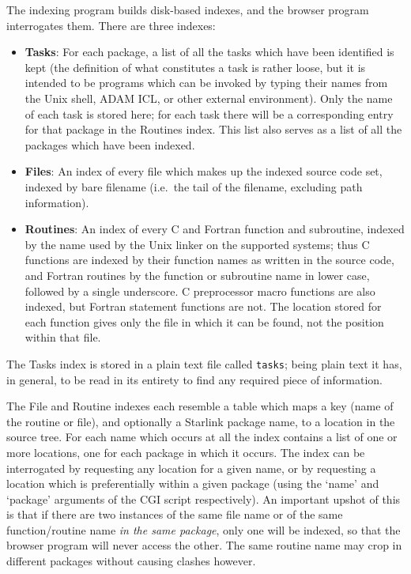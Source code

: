 \documentclass[twoside,11pt]{article}
\renewcommand{\_}{\texttt{\symbol{95}}}
\begin{document}
The indexing program builds disk-based indexes, and the browser program
interrogates them.  There are three indexes:
\begin{itemize}
\item {\bf Tasks}:
For each package, a list of all the tasks which have been identified
is kept (the definition of what constitutes a task is rather 
loose, but it is intended to be programs which can be invoked by
typing their names from the Unix shell, ADAM ICL, or other external
environment).
Only the name of each task is stored here; 
for each task there will be a corresponding entry for
that package in the Routines index.
This list also serves as a list of all the
packages which have been indexed.
%
\item {\bf Files}:
An index of every file which makes up the indexed source code set,
indexed by bare filename (i.e.\ the tail of the filename, excluding
path information).
%
\item {\bf Routines}:
An index of every C and Fortran function and subroutine, 
indexed by the name used by the Unix linker on the supported systems;
thus C functions are indexed by their function names 
as written in the source code, and Fortran routines by the function 
or subroutine name in lower case, followed by a single underscore.
C preprocessor macro functions are also indexed,
but Fortran statement functions are not.
The location stored for each function gives only the file in
which it can be found, not the position within that file.
\end{itemize}

The Tasks index is stored in a plain text file called {\tt tasks};
being plain text it has, in general, to be read in its entirety to find any
required piece of information.

The File and Routine indexes
each resemble a table which
maps a key (name of the routine or file), and optionally a 
Starlink package name, to a location in the source tree. 
For each name which occurs at all 
the index contains a list of one or more locations, 
one for each package in which it occurs.
The index can be interrogated by requesting any location for a given name,
or by requesting a location which is preferentially within a given package
(using the `name' and `package' arguments of the CGI script respectively).
An important upshot of this is that if there are two instances of
the same file name or of the same function/routine name 
{\em in the same package\/}, only one will be indexed, so that the
browser program will never access the other.
The same routine name may crop in different packages without causing
clashes however.
\end{document}
